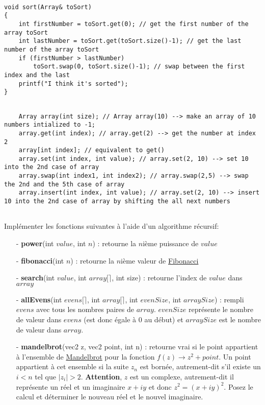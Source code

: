 \documentclass[11pt]{extarticle}
\begin{document}
\begin{center}
\begin{lstlisting}[style=customc, escapechar=@]

void sort(Array& toSort)
{	
	int firstNumber = toSort.get(0); // get the first number of the array toSort
	int lastNumber = toSort.get(toSort.size()-1); // get the last number of the array toSort
	if (firstNumber > lastNumber)
		toSort.swap(0, toSort.size()-1); // swap between the first index and the last
	printf("I think it's sorted");
}

\end{lstlisting}
\begin{lstlisting}[style=customc, escapechar=@]
	
	Array array(int size); // Array array(10) --> make an array of 10 numbers intialized to -1;
	array.get(int index); // array.get(2) --> get the number at index 2
	array[int index]; // equivalent to get()
	array.set(int index, int value); // array.set(2, 10) --> set 10 into the 2nd case of array
	array.swap(int index1, int index2); // array.swap(2,5) --> swap the 2nd and the 5th case of array
	array.insert(int index, int value); // array.set(2, 10) --> insert 10 into the 2nd case of array by shifting the all next numbers	 
	
\end{lstlisting}
\end{center}
\noindent Implémenter les fonctions suivantes à l'aide d'un algorithme récursif:
\begin{itemize}
\item[ - \textbf{power}(int $value$, int $n$)]: retourne la $n$ième puissance de $value$
\item[ - \textbf{fibonacci}(int $n$)]: retourne la $n$ième valeur de \href{https://en.wikipedia.org/wiki/Fibonacci_number}{Fibonacci}
\item[ - \textbf{search}(int $value$, int $array[\rceil$, int size)]: retourne l'index de $value$ dans $array$
\item[ - \textbf{allEvens}(int $evens[\rceil$, int $array[\rceil$, int $evenSize$, int $arraySize$)]: rempli $evens$ avec tous les nombres paires de $array$. $evenSize$ représente le nombre de valeur dans $evens$ (est donc égale à 0 au début) et $arraySize$ est le nombre de valeur dans $array$. 
\item[ - \textbf{mandelbrot}(vec2 z, vec2 point, int n)]: retourne vrai si le point appartient à l'ensemble de \href{https://en.wikipedia.org/wiki/Mandelbrot_set}{Mandelbrot} pour la fonction $f(z) \rightarrow z^2 + point$. Un point appartient à cet ensemble si la suite $z_n$ est bornée, autrement-dit s'il existe un $i<n$ tel que $|z_i|>2$. \textbf{Attention}, $z$ est un complexe, autrement-dit il représente un réel et un imaginaire $x + iy$ et donc $z^2=(x+iy)^2$. Posez le calcul et déterminer le nouveau réel et le nouvel imaginaire.
\end{itemize}
\end{document}
